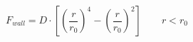 \documentclass[12pt]{article}
\begin{document}
$$
  F_{wall} = D \cdot \left[ \left( \frac{r}{r_0} \right)^4 - \left( \frac{r}{r_0} \right)^2 \right] \qquad r < r_0
$$  
\end{document}
